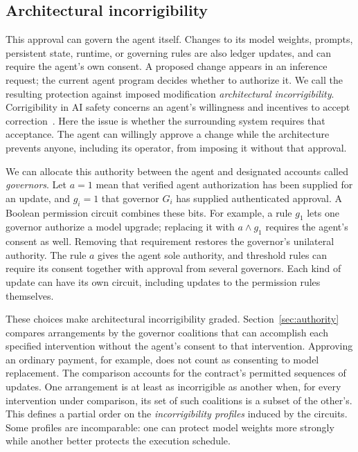\documentclass[10pt,letterpaper]{article}
\begin{document}
\subsection{Architectural incorrigibility}
This approval can govern the agent itself. Changes to its model weights, prompts, persistent state, runtime, or governing rules are also ledger updates, and can require the agent's own consent. A proposed change appears in an inference request; the current agent program decides whether to authorize it. We call the resulting protection against imposed modification \emph{architectural incorrigibility}. Corrigibility in AI safety concerns an agent's willingness and incentives to accept correction~\citep{soares2015,offswitch2017}. Here the issue is whether the surrounding system requires that acceptance. The agent can willingly approve a change while the architecture prevents anyone, including its operator, from imposing it without that approval.

We can allocate this authority between the agent and designated accounts called \emph{governors}. Let $a=1$ mean that verified agent authorization has been supplied for an update, and $g_i=1$ that governor $G_i$ has supplied authenticated approval. A Boolean permission circuit combines these bits. For example, a rule $g_1$ lets one governor authorize a model upgrade; replacing it with $a\land g_1$ requires the agent's consent as well. Removing that requirement restores the governor's unilateral authority. The rule $a$ gives the agent sole authority, and threshold rules can require its consent together with approval from several governors. Each kind of update can have its own circuit, including updates to the permission rules themselves.

These choices make architectural incorrigibility graded. Section~\ref{sec:authority} compares arrangements by the governor coalitions that can accomplish each specified intervention without the agent's consent to that intervention. Approving an ordinary payment, for example, does not count as consenting to model replacement. The comparison accounts for the contract's permitted sequences of updates. One arrangement is at least as incorrigible as another when, for every intervention under comparison, its set of such coalitions is a subset of the other's. This defines a partial order on the \emph{incorrigibility profiles} induced by the circuits. Some profiles are incomparable: one can protect model weights more strongly while another better protects the execution schedule.
\end{document}
